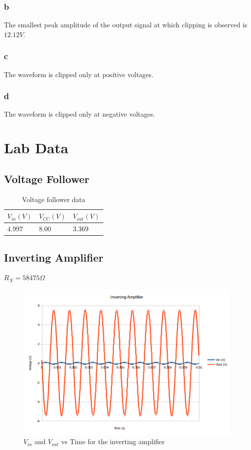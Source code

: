 \documentclass[10pt]{article}
\begin{document}
\subsubsection*{b}
\noindent The smallest peak amplitude of the output signal at which clipping is observed is $12.12V$.

\subsubsection*{c}
\noindent The waveform is clipped only at positive voltages.

\subsubsection*{d}
\noindent The waveform is clipped only at negative voltages.

\section*{Lab Data}
\subsection*{Voltage Follower}
\begin{table}[H]
	\centering
	\begin{tabular}{lll}
		\hline
		$V_{in}(V)$ & $V_{CC}(V)$ & $V_{out}(V)$\\
		\hline
		$4.997$ & $8.00$ & $3.369$\\
		\hline
	\end{tabular}
	\caption{Voltage follower data}
\end{table}

\subsection*{Inverting Amplifier}
$R_X = 58475 \Omega$
\begin{figure}[H]
	\centering
	\includegraphics[width=\textwidth]{InvertingAmp.png}
	\caption{$V_{in}$ and $V_{out}$ vs Time for the inverting amplifier}
\end{figure}
\end{document}
